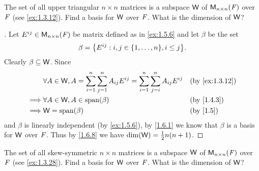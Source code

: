 \begin{ex}\label{ex:1.6.16}
  The set of all upper triangular \(n \times n\) matrices is a subspace \(\mathsf{W}\) of \(\mathsf{M}_{{n} \times n}({\mathit{F}})\) over \(\mathit{F}\) (see \cref{ex:1.3.12}).
  Find a basis for \(\mathsf{W}\) over \(\mathit{F}\).
  What is the dimension of \(\mathsf{W}\)?
\end{ex}

\begin{proof}[]
  Let \(E^{i j} \in \mathsf{M}_{{n} \times n}({\mathit{F}})\) be matrix defined as in \cref{ex:1.5.6} and let \(\beta\) be the set
  \[
    \beta = \set{E^{i j} : i, j \in \set{1, \dots, n}, i \leq j}.
  \]
  Clearly \(\beta \subseteq \mathsf{W}\).
  Since
  \begin{align*}
             & \forall A \in \W, A = \sum_{i = 1}^n \sum_{j = 1}^n A_{i j} E^{i j} = \sum_{i = 1}^n \sum_{j = i}^n A_{i j} E^{i j} &  & \text{(by \cref{ex:1.3.12})} \\
    \implies & \forall A \in \W, A \in \spn{\beta}                                                                                 &  & \text{(by \cref{1.4.3})}     \\
    \implies & \W = \spn{\beta}                                                                                                    &  & \text{(by \cref{1.5})}
  \end{align*}
  and \(\beta\) is linearly independent (by \cref{ex:1.5.6}), by \cref{1.6.1} we know that \(\beta\) is a basis for \(\mathsf{W}\) over \(\mathit{F}\).
  Thus by \cref{1.6.8} we have \(\dim(\mathsf{W}) = \frac{1}{2} n(n + 1)\).
\end{proof}

\begin{ex}\label{ex:1.6.17}
  The set of all skew-symmetric \(n \times n\) matrices is a subspace \(\mathsf{W}\) of \(\mathsf{M}_{{n} \times n}({\mathit{F}})\) over \(\mathit{F}\) (see \cref{ex:1.3.28}).
  Find a basis for \(\mathsf{W}\) over \(\mathit{F}\).
  What is the dimension of \(\mathsf{W}\)?
\end{ex}

